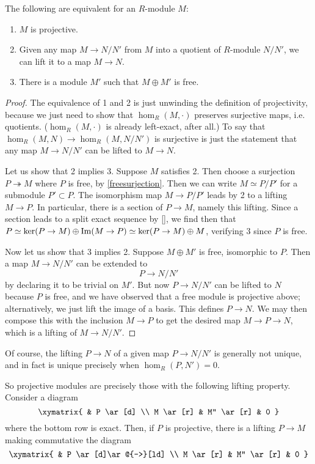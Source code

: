 \begin{proposition} \label{projmod}
The following are equivalent for an $R$-module $M$:
\begin{enumerate}
\item $M$ is projective.
\item Given any map $M \to N/N'$ from $M$ into a quotient of $R$-module
$N/N'$, we can lift
it to a map $M \to N$.
\item There is a module $M'$ such that $M \oplus M'$ is free.
\end{enumerate}
\end{proposition}
\begin{proof}
The equivalence of 1 and 2 is just unwinding the definition of projectivity,
because we just need to show that $\hom_R(M, \cdot)$ preserves surjective
maps, i.e. quotients.  ($\hom_R(M, \cdot)$ is already left-exact, after all.)
To say that $\hom_R(M, N) \to \hom_R(M, N/N')$ is surjective is just the
statement that any map $M \to N/N'$
can be lifted to $M \to N$.

Let us show that 2 implies 3.  Suppose $M$ satisfies 2.  Then choose a
surjection $P \twoheadrightarrow M$ where $P$ is free, by
\cref{freesurjection}. Then we can
write $M \simeq P/P'$ for a submodule $P' \subset P$. The isomorphism map
$M \to P/P'$
leads by 2 to a lifting $M \to P$.  In particular, there is a section of $P
\to M$,
namely this lifting.  Since a section leads to a split exact sequence by
\cref{}, we find then that $P \simeq \ker(P \to M) \oplus \operatorname{Im}(M \to P) \simeq
\ker(P \to M) \oplus M$,
verifying 3 since $P$ is free.

Now let us show that 3 implies 2.
Suppose $M \oplus M'$ is free, isomorphic to $P$. Then a map $M \to N/N'$ can
be extended to
\[ P \to N/N'  \]
by declaring it to be trivial on $M'$.  But now $P \to N/N'$ can be lifted to
$N$ because $P$ is free, and we have observed that a free module is
projective above; alternatively, we just lift the image of a basis. This
defines $P
\to N$.  We may then compose this with the inclusion $M \to P$ to  get the
desired map $M \to P \to N$,
which is a lifting of $M \to N/N'$.
\end{proof}

Of course, the lifting $P \to N$ of a given map $P \to N/N'$ is generally not
unique, and in fact is unique precisely when $\hom_R(P,N') = 0$.

So projective modules are precisely those with the following lifting property.
Consider a diagram
\[ \xymatrix{
& P \ar[d] \\
M \ar[r] & M'' \ar[r] &  0
}\]
where the bottom row is exact. Then, if $P$ is projective, there is a lifting
$P \to M$ making commutative the diagram
\[ \xymatrix{
& P \ar[d]\ar@{-->}[ld] \\
M \ar[r] & M'' \ar[r] &  0
}\]

